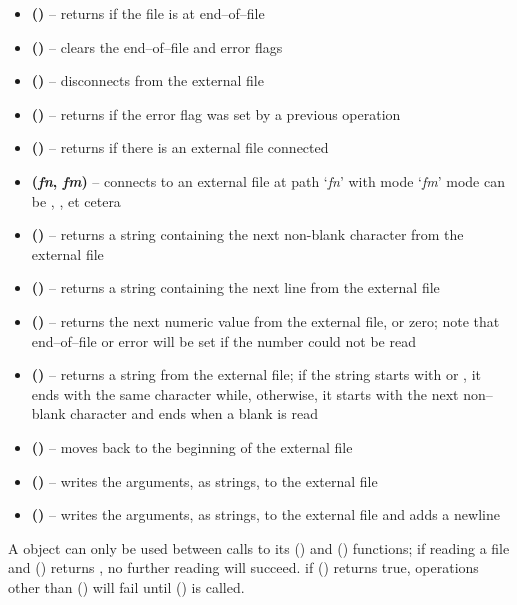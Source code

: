 \begin{itemize}
\item \textbf{()} -- returns  if the file is at end--of--file
\item \textbf{()} -- clears the end--of--file and error flags
\item \textbf{()} -- disconnects from the external file
\item \textbf{()} -- returns  if the error flag was set by a
previous operation
\item \textbf{()} -- returns  if there is an external file
connected
\item \textbf{(\textit{fn}, \textit{fm})} -- connects to an external file at
path `\textit{fn}' with mode `\textit{fm}' \openSq{}mode can be ,
, et cetera\closeSq
\item \textbf{()} -- returns a string containing the next non-blank
character from the external file
\item \textbf{()} -- returns a string containing the next line from the
external file
\item \textbf{()} -- returns the next numeric value from the external
file, or zero; note that end--of--file or error will be set if the number could not be
read
\item \textbf{()} -- returns a string from the external file; if the
string starts with  or , it ends with the same character while,
otherwise, it starts with the next non--blank character and ends when a blank is read
\item \textbf{()} -- moves back to the beginning of the external file
\item \textbf{(\textellipsis)} -- writes the arguments, as strings, to the
external file
\item \textbf{(\textellipsis)} -- writes the arguments, as strings, to
the external file and adds a newline
\end{itemize}
A  object can only be used between calls to its () and
() functions; if reading a file and () returns ,
no further reading will succeed.
if () returns true, operations other than () will fail
until () is called.
\tertiaryEnd{}
